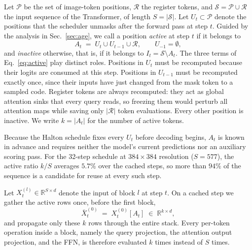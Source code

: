 Let $\mathcal{P}$ be the set of image-token positions, $\mathcal{R}$ the register tokens, and $\mathcal{S}=\mathcal{P}\cup\mathcal{R}$ the input sequence of the Transformer, of length $S=|\mathcal{S}|$. Let $U_t\subset\mathcal{P}$ denote the positions that the scheduler unmasks after the forward pass at step $t$. Guided by the analysis in Sec.~\ref{sec:age}, we call a position \emph{active} at step $t$ if it belongs to
\begin{equation}
    A_t \;=\; U_t \cup U_{t-1} \cup \mathcal{R},
    \qquad U_{-1}=\emptyset,
    \label{eq:active}
\end{equation}
and \emph{inactive} otherwise, that is, if it belongs to $I_t=\mathcal{S}\setminus A_t$. The three terms of Eq.~\eqref{eq:active} play distinct roles. Positions in $U_t$ must be recomputed because their logits are consumed at this step. Positions in $U_{t-1}$ must be recomputed exactly once, since their inputs have just changed from the mask token to a sampled code. Register tokens are always recomputed: they act as global attention sinks that every query reads, so freezing them would perturb all attention maps while saving only $|\mathcal{R}|$ token evaluations. Every other position is inactive. We write $k=|A_t|$ for the number of active tokens.

Because the Halton schedule fixes every $U_t$ before decoding begins, $A_t$ is known in advance and requires neither the model's current predictions nor an auxiliary scoring pass. For the 32-step schedule at $384\times384$ resolution ($S=577$), the active ratio $k/S$ averages $5.7\%$ over the cached steps, so more than $94\%$ of the sequence is a candidate for reuse at every such step.

Let $X_t^{(l)}\in\mathbb{R}^{S\times d}$ denote the input of block $l$ at step $t$. On a cached step we gather the active rows once, before the first block,
\begin{equation}
    \bar{X}_t^{(0)} \;=\; X_t^{(0)}[A_t] \;\in\; \mathbb{R}^{k\times d},
    \label{eq:gather}
\end{equation}
and propagate only these $k$ rows through the entire stack. Every per-token operation inside a block, namely the query projection, the attention output projection, and the FFN, is therefore evaluated $k$ times instead of $S$ times.

